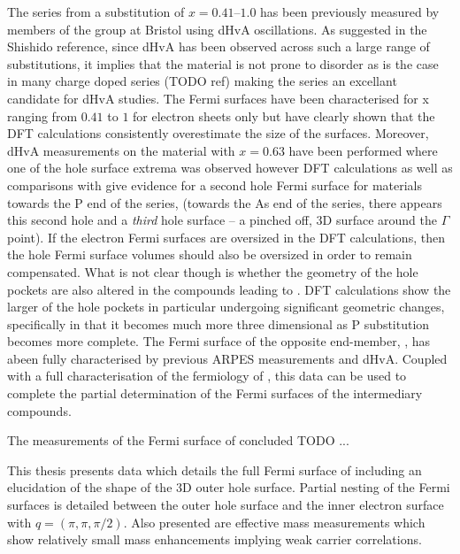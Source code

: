 The \BaFePAs series from a substitution of $x=0.41$--$1.0$ has been previously measured by members of the group at Bristol using dHvA oscillations\cite{Shishido2010}. As suggested in the Shishido reference, since dHvA has been observed across such a large range of substitutions, it implies that the material is not prone to disorder as is the case in many charge doped series (TODO ref) making the series an excellant candidate for dHvA studies. The Fermi surfaces have been characterised for x ranging from $0.41$ to $1$ for electron sheets only but have clearly shown that the DFT calculations consistently overestimate the size of the surfaces. Moreover, dHvA measurements on the material with $x=0.63$ have been performed where one of the hole surface extrema was observed\cite{Analytis2010c} however DFT calculations as well as comparisons with \SrFeP\cite{Analytis2009} give evidence for a second hole Fermi surface for materials towards the P end of the series, (towards the As end of the series, there appears this second hole and a \textit{third} hole surface -- a pinched off, 3D surface around the $\Gamma$ point). If the electron Fermi surfaces are oversized in the DFT calculations, then the hole Fermi surface volumes should also be oversized in order to remain compensated. What is not clear though is whether the geometry of the hole pockets are also altered in the compounds leading to \BaFeP. DFT calculations show the larger of the hole pockets in particular undergoing significant geometric changes, specifically in that it becomes much more three dimensional as P substitution becomes more complete. The Fermi surface of the opposite end-member, \BaFeAs, has abeen fully characterised by previous ARPES measurements\cite{Kondo2010a} and dHvA\cite{Terashima2011, Analytis2010b}. Coupled with a full characterisation of the fermiology of \BaFeP, this data can be used to complete the partial determination of the Fermi surfaces of the intermediary compounds.

The measurements of the Fermi surface of \BaFeAs concluded TODO ...

This thesis presents data which details the full Fermi surface of \BaFeP including an elucidation of the shape of the 3D outer hole surface. Partial nesting of the Fermi surfaces is detailed between the outer hole surface and the inner electron surface with $q=(\pi, \pi, \pi/2)$. Also presented are effective mass measurements which show relatively small mass enhancements implying weak carrier correlations.
